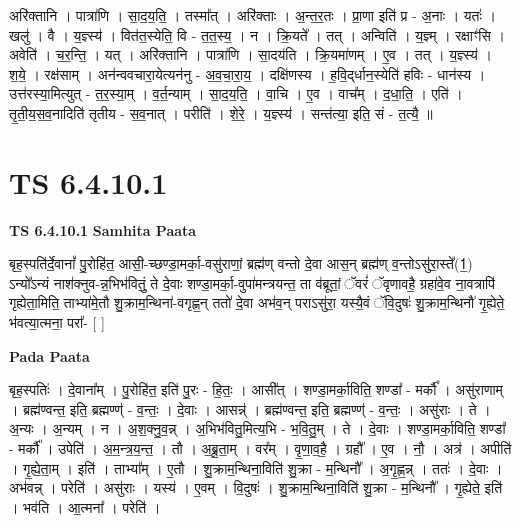 \documentclass[17pt]{extarticle}
\begin{document}
अरि॑क्तानि । पात्रा॑णि । सा॒द॒य॒ति॒ । तस्मा᳚त् । अरि॑क्ताः । अ॒न्त॒र॒तः । प्रा॒णा इति॑ प्र - अ॒नाः । यतः॑ । खलु॑ । वै । य॒ज्ञ्स्य॑ । वित॑त॒स्येति॒ वि - त॒त॒स्य॒ । न । क्रि॒यते᳚ । तत् । अन्विति॑ । य॒ज्ञ्म् । रक्षाꣳ॑सि । अवेति॑ । च॒र॒न्ति॒ । यत् । अरि॑क्तानि । पात्रा॑णि । सा॒दय॑ति । क्रि॒यमा॑णम् । ए॒व । तत् । य॒ज्ञ्स्य॑ । श॒ये॒ । रक्ष॑साम् । अन॑न्ववचारा॒येत्यन॑नु - अ॒व॒चा॒रा॒य॒ । दक्षि॑णस्य । ह॒वि॒द्‌र्धान॒स्येति॑ हविः - धान॑स्य । उत्त॑रस्या॒मित्युत् - त॒र॒स्या॒म् । व॒र्त॒न्याम् । सा॒द॒य॒ति॒ । वा॒चि । ए॒व । वाच᳚म् । द॒धा॒ति॒ । एति॑ । तृ॒ती॒य॒स॒व॒नादिति॑ तृतीय - स॒व॒नात् । परीति॑ । शे॒रे॒ । य॒ज्ञ्स्य॑ । सन्त॑त्या॒ इति॒ सं - त॒त्यै॒ ॥  \newline




\section*{ TS 6.4.10.1 }

\textbf{TS 6.4.10.1 } \newline
\textbf{Samhita Paata} \newline

बृह॒स्पति॑र्दे॒वानां᳚ पु॒रोहि॑त॒ आसी॒-च्छण्डा॒मर्का॒-वसु॑राणां॒ ब्रह्म॑ण् वन्तो दे॒वा आस॒न् ब्रह्म॑ण् व॒न्तोऽसु॑रा॒स्ते᳚(1॒) ऽन्यो᳚ऽन्यं नाश॑क्नुव-न्न॒भिभ॑वितुं॒ ते दे॒वाः शण्डा॒मर्का॒-वुपा॑मन्त्रयन्त॒ ता व॑ब्रूतां॒ ॅवरं॑ ॅवृणावहै॒ ग्रहा॑वे॒व ना॒वत्रापि॑ गृह्येता॒मिति॒ ताभ्या॑मे॒तौ शु॒क्राम॒न्थिना॑-वगृह्ण॒न् ततो॑ दे॒वा अभ॑व॒न् पराऽसु॑रा॒ यस्यै॒वं ॅवि॒दुषः॑ शु॒क्राम॒न्थिनौ॑ गृ॒ह्येते॒ भ॑वत्या॒त्मना॒ परा᳚- [  ] \newline

\textbf{Pada Paata} \newline

बृह॒स्पतिः॑ । दे॒वाना᳚म् । पु॒रोहि॑त॒ इति॑ पु॒रः - हि॒तः॒ । आसी᳚त् । शण्डा॒मर्का॒विति॒ शण्डा᳚ - मर्कौ᳚ । असु॑राणाम् । ब्रह्म॑ण्वन्त॒ इति॒ ब्रह्मण्ण्॑ - व॒न्तः॒ । दे॒वाः । आसन्न्॑ । ब्रह्म॑ण्वन्त॒ इति॒ ब्रह्मण्ण्॑ - व॒न्तः॒ । असु॑राः । ते । अ॒न्यः । अ॒न्यम् । न । अ॒श॒क्नु॒व॒न्न् । अ॒भिभ॑वितु॒मित्य॒भि - भ॒वि॒तु॒म् । ते । दे॒वाः । शण्डा॒मर्का॒विति॒ शण्डा᳚ - मर्कौ᳚ । उपेति॑ । अ॒म॒न्त्र॒य॒न्त॒ । तौ । अ॒ब्रू॒ता॒म् । वर᳚म् । वृ॒णा॒व॒है॒ । ग्रहौ᳚ । ए॒व । नौ॒ । अत्र॑ । अपीति॑ । गृ॒ह्ये॒ता॒म् । इति॑ । ताभ्या᳚म् । ए॒तौ । शु॒क्राम॒न्थिना॒विति॑ शु॒क्रा - म॒न्थिनौ᳚ । अ॒गृ॒ह्ण॒न्न् । ततः॑ । दे॒वाः । अभ॑वन्न् । परेति॑ । असु॑राः । यस्य॑ । ए॒वम् । वि॒दुषः॑ । शु॒क्राम॒न्थिना॒विति॑ शु॒क्रा - म॒न्थिनौ᳚ । गृ॒ह्येते॒ इति॑ । भव॑ति । आ॒त्मना᳚ । परेति॑ ।  \newline
\end{document}
